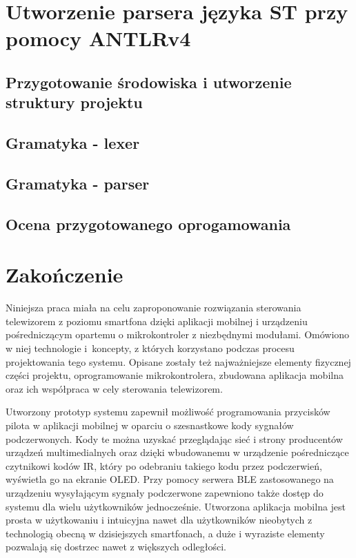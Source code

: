 \documentclass[12pt,twoside]{article}
\begin{document}
\section{Utworzenie parsera języka ST przy pomocy ANTLRv4}
\subsection{Przygotowanie środowiska i utworzenie struktury projektu}
\subsection{Gramatyka - lexer}
\subsection{Gramatyka - parser}
\subsection{Ocena przygotowanego oprogamowania}
\clearpage

\section{Zakończenie}

Niniejsza praca miała na celu zaproponowanie rozwiązania sterowania telewizorem z poziomu smartfona dzięki aplikacji mobilnej i urządzeniu pośredniczącym opartemu o mikrokontroler z niezbędnymi modułami. Omówiono w niej technologie i~koncepty, z których korzystano podczas procesu projektowania tego systemu. Opisane zostały też najważniejsze elementy fizycznej części projektu, oprogramowanie mikrokontrolera, zbudowana aplikacja mobilna oraz ich współpraca w cely sterowania telewizorem.

Utworzony prototyp systemu zapewnił możliwość programowania przycisków pilota w aplikacji mobilnej w oparciu o szesnastkowe kody sygnałów podczerwonych. Kody te można uzyskać przeglądając sieć i strony producentów urządzeń multimedialnych oraz dzięki wbudowanemu w urządzenie pośredniczące czytnikowi kodów IR, który po odebraniu takiego kodu przez podczerwień, wyświetla go na ekranie OLED. Przy pomocy serwera BLE zastosowanego na urządzeniu wysyłającym sygnały podczerwone zapewniono także dostęp do systemu dla wielu użytkowników jednocześnie. Utworzona aplikacja mobilna jest prosta w użytkowaniu i intuicyjna nawet dla użytkowników nieobytych z technologią obecną w dzisiejszych smartfonach, a duże i wyraziste elementy pozwalają się dostrzec nawet z większych odległości.
\end{document}
